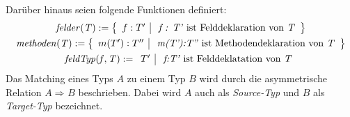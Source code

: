 \documentclass[a4paper,12pt]{article}
\newcommand{\matchTyp}[3]
{
#1  
\Rightarrow_{#2}
 #3
}
\begin{document}
Darüber hinaus seien folgende Funktionen definiert:
\begin{gather*}
\mathit{felder(T)} :=  \left\{ 
				\begin{array}{l|l}
					f : T' & \text{ \emph{f : T'} ist Felddeklaration von \emph{T}}
				\end{array}
              \right\}\\
\mathit{methoden(T)} := \left\{ 
				\begin{array}{l|l}
					m(T'):T'' & \text{ \emph{m(T'):T''} ist Methodendeklaration von 										\emph{T}}
				\end{array}
              \right\}\\
\mathit{feldTyp(f,T)} := 
				\begin{array}{l|l}
					T' & \text{ \emph{f:T'} ist Felddeklatation von 										\emph{T}}
				\end{array}              
\end{gather*}
\noindent
Das Matching eines Typs $A$ zu einem Typ $B$ wird durch die asymmetrische Relation $\matchTyp{A}{}{B}$ beschrieben. Dabei wird $A$ auch als \emph{Source-Typ} und $B$ als \emph{Target-Typ} bezeichnet.
\end{document}
